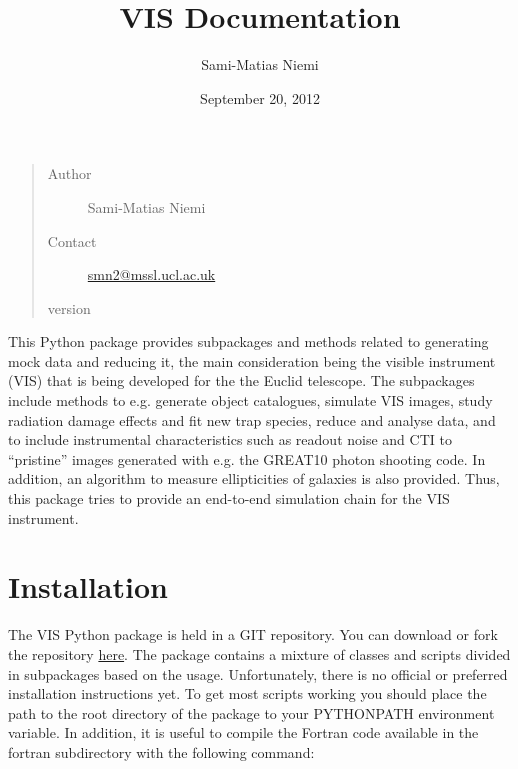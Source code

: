 \documentclass[a4paper,12pt,english]{sphinxmanual}
\title{VIS Documentation}
\date{September 20, 2012}
\author{Sami-Matias Niemi}
\begin{document}
\maketitle
\tableofcontents
{}\label{index::doc}

\begin{quote}\begin{description}
\item[{Author}] \leavevmode
Sami-Matias Niemi

\item[{Contact}] \leavevmode
\href{mailto:smn2@mssl.ucl.ac.uk}{smn2@mssl.ucl.ac.uk}

\item[{version}] 

\end{description}\end{quote}

This Python package provides subpackages and methods related to generating mock data and reducing it, the main
consideration being the visible instrument (VIS) that is being developed for the
the Euclid telescope. The subpackages include methods to e.g. generate object catalogues, simulate VIS images,
study radiation damage effects and fit new trap species, reduce and analyse data, and to include instrumental
characteristics such as readout noise and CTI to ``pristine'' images generated with e.g. the GREAT10 photon
shooting code. In addition, an algorithm to measure ellipticities of galaxies is also provided. Thus,
this package tries to provide an end-to-end simulation chain for the VIS instrument.


\chapter{Installation}
\label{index:installation}\label{index:welcome-to-euclid-visible-instrument-vis-python-package-documentation}
The VIS Python package is held in a GIT repository. You can download or fork the repository
\href{https://bitbucket.org/niemi/vissim-python/overview}{here}. The package contains a mixture of classes
and scripts divided in subpackages based on the usage. Unfortunately, there is no official or preferred
installation instructions yet. To get most scripts working you should place
the path to the root directory of the package to your PYTHONPATH environment variable. In addition, it is
useful to compile the Fortran code available in the fortran subdirectory with the following command:
\end{document}
